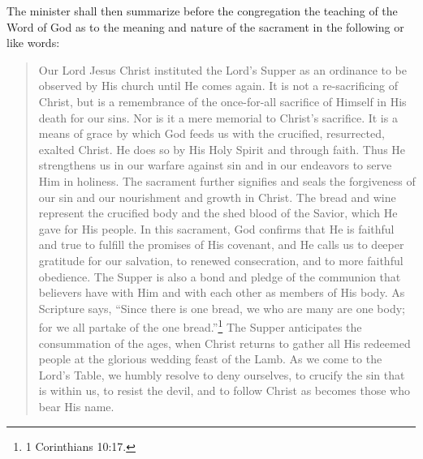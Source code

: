 \documentclass[
]{book}
\begin{document}
\begin{enumerate}
  The minister shall then summarize before the congregation the teaching of the Word of God as to the meaning and nature of the sacrament in the following or like words:

  \begin{quote}
  Our Lord Jesus Christ instituted the Lord's Supper as an ordinance to be observed by His church until He comes again. It is not a re-sacrificing of Christ, but is a remembrance of the once-for-all sacrifice of Himself in His death for our sins. Nor is it a mere memorial to Christ's sacrifice. It is a means of grace by which God feeds us with the crucified, resurrected, exalted Christ. He does so by His Holy Spirit and through faith. Thus He strengthens us in our warfare against sin and in our endeavors to serve Him in holiness. The sacrament further signifies and seals the forgiveness of our sin and our nourishment and growth in Christ. The bread and wine represent the crucified body and the shed blood of the Savior, which He gave for His people. In this sacrament, God confirms that He is faithful and true to fulfill the promises of His covenant, and He calls us to deeper gratitude for our salvation, to renewed consecration, and to more faithful obedience. The Supper is also a bond and pledge of the communion that believers have with Him and with each other as members of His body. As Scripture says, ``Since there is one bread, we who are many are one body; for we all partake of the one bread.''\footnote{1 Corinthians 10:17.} The Supper anticipates the consummation of the ages, when Christ returns to gather all His redeemed people at the glorious wedding feast of the Lamb. As we come to the Lord's Table, we humbly resolve to deny ourselves, to crucify the sin that is within us, to resist the devil, and to follow Christ as becomes those who bear His name.
  \end{quote}
\end{enumerate}
\end{document}
